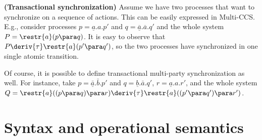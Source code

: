% 
% 
% 
% 
% 

\begin{example}\label{trans-synch}{\bf (Transactional synchronization)} 
Assume we have two processes that want to synchronize
on a sequence of actions. 
This can be easily expressed in Multi-CCS. E.g., consider processes $p = \underline{a}.a.p'$ and
$q =\underline{\overline{a}}.\overline{a}.q'$ and the whole system $P = \restr{a}(p \para q)$. It is easy to observe
that $P \deriv{\tau} \restr{a}(p' \para q')$, so the two processes have synchronized in one single atomic transition.

Of course, it is possible to define transactional multi-party synchronization as well. 
For instance,  take
$p =\underline{\bar{a}}.\bar{b}.p'$ and $q = \underline{b}.\bar{a}.q'$, $r = \underline{a}.a.r'$, and the whole system $Q =
 \restr{a}((p \para q) \para r) \deriv{\tau} \restr{a}((p' \para q') \para r')$.
\fine
\end{example}


\section{Syntax and operational semantics} \label{syntax-sos-multi}

